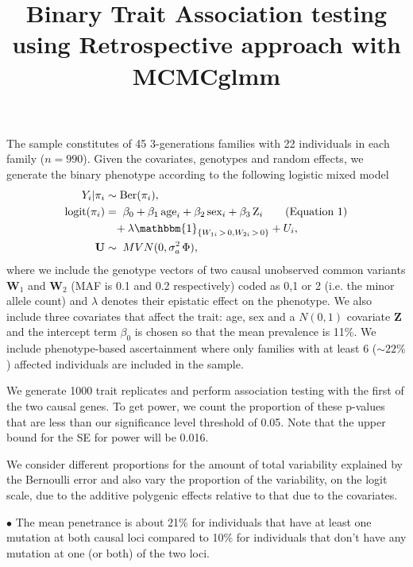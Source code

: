 \documentclass[11pt,a4paper,english]{article}
\title{Binary Trait Association testing using Retrospective approach with MCMCglmm}
\date{\vspace{-7ex}}
\newcommand\numberthis{\stepcounter{equation}{}\tag{Equation \theequation}}
\begin{document}
\maketitle

The sample constitutes of 45 3-generations families with 22 individuals in each family ($n=990$). Given the covariates, genotypes and random effects, we generate the binary phenotype according to the following logistic mixed model
\begin{align*}
Y_i|\pi_i &\sim \text{Ber}(\pi_i),\\
\text{logit}(\pi_i) &=  \;\beta_0 + \beta_1\, \text{age}_i + \beta_2\, \text{sex}_i + \beta_3\, \text{Z}_i \numberthis\\
&\;\;\; +\lambda \mathbbm{1}_{\{W_{1i}\,>\,0,W_{2i}\,>\,0\}} + U_i,\\
 \mathbf{U} &\sim \; MVN(0, \sigma_a^2\, \Phi),
\end{align*}
where we include the genotype vectors of two causal unobserved common variants $\mathbf{W}_1$ and $\mathbf{W}_2$ (MAF is 0.1 and 0.2 respectively) coded as 0,1 or 2 (i.e. the minor allele count) and $\lambda$ denotes their epistatic effect on the phenotype. We also include three covariates that affect the trait: age, sex and a $N(0,1)$ covariate $\mathbf{Z}$ and the intercept term $\beta_0$ is chosen so that the mean prevalence is 11\%. We include phenotype-based ascertainment where only families with at least 6 ($\sim 22\%$) affected individuals are included in the sample.

We generate 1000 trait replicates and perform association testing with the first of the two causal genes. To get power, we count the proportion of these p-values that are less than our significance level threshold of 0.05. Note that the upper bound for the SE for power will be 0.016. 

We consider different proportions for the amount of total variability explained by the Bernoulli error and also vary the proportion of the variability, on the logit scale, due to the additive polygenic effects relative to that due to the covariates.

\vspace{.4cm}
$\bullet$
The mean penetrance is about 21\% for individuals that have at least one mutation at both causal loci compared to 10\% for individuals that don't have any mutation at one (or both) of the two loci. 
\end{document}
